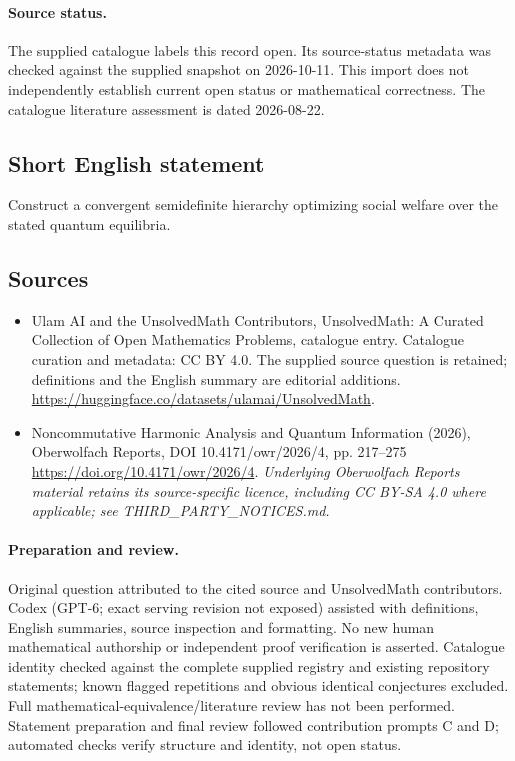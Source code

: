 \documentclass[11pt]{article}
\begin{document}
\paragraph{Source status.}
The supplied catalogue labels this record open. Its source-status metadata was checked against the supplied snapshot on 2026-10-11. This import does not independently establish current open status or mathematical correctness. The catalogue literature assessment is dated 2026-08-22.
\subsection{Short English statement}
Construct a convergent semidefinite hierarchy optimizing social welfare over the stated quantum equilibria.
\subsection{Sources}
\begin{itemize}
\item[\hypertarget{source:statement:1}{S1}] Ulam AI and the UnsolvedMath Contributors, UnsolvedMath: A Curated Collection of Open Mathematics Problems, catalogue entry. Catalogue curation and metadata: CC BY 4.0. The supplied source question is retained; definitions and the English summary are editorial additions.
\url{https://huggingface.co/datasets/ulamai/UnsolvedMath}.
\item[\hypertarget{source:statement:2}{S2}] Noncommutative Harmonic Analysis and Quantum Information (2026), Oberwolfach Reports, DOI 10.4171/owr/2026/4, pp. 217--275
\url{https://doi.org/10.4171/owr/2026/4}.
\textit{Underlying Oberwolfach Reports material retains its source-specific licence, including CC BY-SA 4.0 where applicable; see THIRD\_PARTY\_NOTICES.md.}
\end{itemize}
\paragraph{Preparation and review.}
Original question attributed to the cited source and UnsolvedMath contributors. Codex (GPT-6; exact serving revision not exposed) assisted with definitions, English summaries, source inspection and formatting. No new human mathematical authorship or independent proof verification is asserted. Catalogue identity checked against the complete supplied registry and existing repository statements; known flagged repetitions and obvious identical conjectures excluded. Full mathematical-equivalence/literature review has not been performed. Statement preparation and final review followed contribution prompts C and D; automated checks verify structure and identity, not open status.
\label{end:statement}
\end{document}
